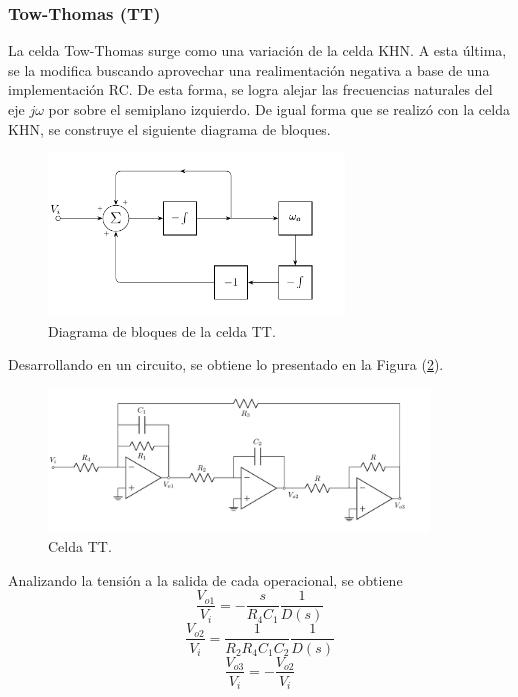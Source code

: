 \subsubsection{Tow-Thomas (TT)}
La celda Tow-Thomas%
 surge como una variación de la celda KHN. A esta última, se la modifica buscando aprovechar una realimentación negativa a base de una implementación RC. De esta forma, se logra alejar las frecuencias naturales del eje $j\omega$ por sobre el semiplano izquierdo. De igual forma que se realizó con la celda KHN, se construye el siguiente diagrama de bloques.
\begin{figure}[H]
\centering
	\includegraphics[width=0.7\textwidth]{ImagenesEjercicio4/Bloques-TT.pdf}
	\caption{Diagrama de bloques de la celda TT.}
	\label{fig:blockTT}
\end{figure}

Desarrollando en un circuito, se obtiene lo presentado en la Figura (\ref{fig:TT}).
\begin{figure}[H]
\centering
	\includegraphics[width=0.9\textwidth]{ImagenesEjercicio4/TT.pdf}
	\caption{Celda TT.}
	\label{fig:TT}
\end{figure}

Analizando la tensión a la salida de cada operacional, se obtiene
\begin{equation}
	\frac{V_{o1}}{V_i} = -\frac{s}{R_4C_1}\frac{1}{D(s)}
\end{equation}
\begin{equation}
	\frac{V_{o2}}{V_i} = \frac{1}{R_2 R_4 C_1 C_2}\frac{1}{D(s)}
\end{equation}
\begin{equation}
	\frac{V_{o3}}{V_i} = -\frac{V_{o2}}{V_i}
\end{equation}

